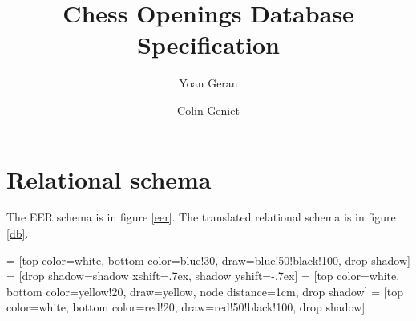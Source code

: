 \documentclass{article}
\begin{document}
\title{Chess Openings Database Specification}
\author{Yoan Geran \and Colin Geniet}
\maketitle

\tableofcontents

\section{Relational schema}
The EER schema is in figure \ref{eer}.
The translated relational schema is in figure \ref{db}.


 = [top color=white, bottom color=blue!30, 
                            draw=blue!50!black!100, drop shadow]
 = [drop shadow={shadow xshift=.7ex, 
                                 shadow yshift=-.7ex}]
 = [top color=white, bottom color=yellow!20, 
                               draw=yellow, node distance=1cm, drop shadow]
 = [top color=white, bottom color=red!20, 
                                  draw=red!50!black!100, drop shadow]
\end{document}
